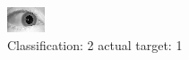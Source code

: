 \begin{figure}[h!]
\begin{center}
\includegraphics[width=0.60\columnwidth]{figures/ID1482_class_2_target_1.png}
\end{center}
\caption{ Classification: 2 actual target: 1}
\label{fig:ID1482_class_2_target_1}
\end{figure}
